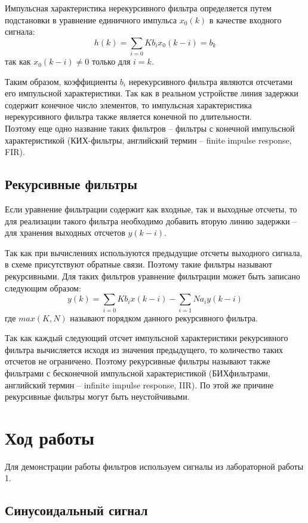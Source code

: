 \documentclass[a4paper]{article}
\begin{document}
Импульсная характеристика нерекурсивного фильтра определяется путем подстановки в уравнение единичного импульса $x_0(k)$ в качестве входного сигнала:
$$h(k)=\sum_{i=0}Kb_ix_0(k − i) = b_k$$
так как $x_0(k - i)\ne0$ только для $i=k$.

Таким образом, коэффициенты $b_i$ нерекурсивного фильтра являются отсчетами его импульсной характеристики. Так как в реальном устройстве линия задержки содержит конечное число элементов, то импульсная характеристика нерекурсивного фильтра также является конечной по длительности.\\
Поэтому еще одно название таких фильтров -- фильтры с конечной импульсной характеристикой (КИХ-фильтры, английский термин -- finite impulse response, FIR).

\subsection{Рекурсивные фильтры}
Если уравнение фильтрации содержит как входные, так и выходные отсчеты, то для реализации такого фильтра необходимо добавить вторую линию задержки -- для хранения выходных отсчетов $y(k - i)$.

Так как при вычислениях используются предыдущие отсчеты выходного сигнала, в
схеме присутствуют обратные связи. Поэтому такие фильтры называют рекурсивными. Для таких фильтров уравнение фильтрации может быть записано следующим образом:
$$y(k)=\sum_{i=0}Kb_ix(k − i)-\sum_{i=1}Na_iy(k − i)$$
где $max(K,N)$ называют порядком данного рекурсивного фильтра.

Так как каждый следующий отсчет импульсной характеристики рекурсивного фильтра вычисляется исходя из значения предыдущего, то количество таких отсчетов не ограничено. Поэтому рекурсивные фильтры называют также фильтрами с бесконечной импульсной характеристикой (БИХфильтрами, английский термин -- infinite impulse response, IIR). По этой же причине рекурсивные фильтры могут быть неустойчивыми.
\newpage
\section{Ход работы}
Для демонстрации работы фильтров используем сигналы из лабораторной работы 1. 
\subsection{Синусоидальный сигнал}\\
\end{document}
